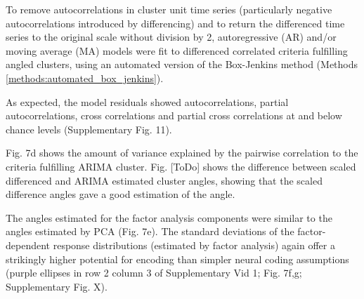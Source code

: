 \documentclass{article}
\begin{document}
To remove autocorrelations in cluster unit time series (particularly negative autocorrelations introduced by differencing) and to return the differenced time series to the original scale without division by 2, autoregressive (AR) and/or moving average (MA) models were fit to differenced correlated criteria fulfilling angled clusters, using an automated version of the Box-Jenkins method (Methods \ref{methods:automated_box_jenkins}).
 
As expected, the model residuals showed autocorrelations, partial autocorrelations, cross correlations and partial cross correlations at and below chance levels (Supplementary Fig. 11). 


Fig. 7d shows the amount of variance explained by the pairwise correlation to the criteria fulfilling ARIMA cluster.
Fig. [ToDo] shows the difference between scaled differenced and ARIMA estimated cluster angles, showing that the scaled difference angles gave a good estimation of the angle.

The angles estimated for the factor analysis components were similar to the angles estimated by PCA (Fig. 7e). The standard deviations of the factor-dependent response distributions (estimated by factor analysis) again offer a strikingly higher potential for encoding than simpler neural coding assumptions (purple ellipses in row 2 column 3 of Supplementary Vid 1; Fig. 7f,g; Supplementary Fig. X).
\end{document}
